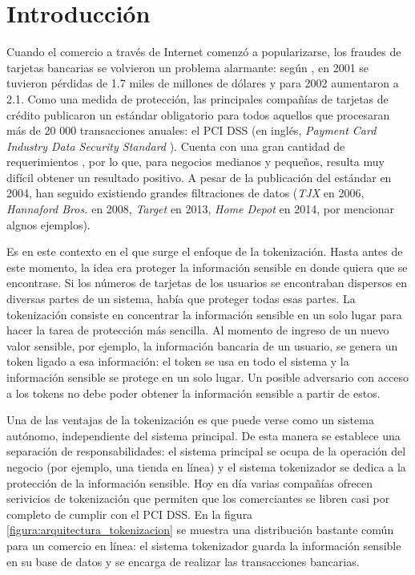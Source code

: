 %
%

\section{Introducción}


Cuando el comercio a través de Internet comenzó a popularizarse, los fraudes de
tarjetas bancarias se volvieron un problema alarmante: según \cite{wallethub},
en 2001 se tuvieron pérdidas de 1.7 miles de millones de dólares y para 2002
aumentaron a 2.1. Como una medida de protección, las principales compañías de
tarjetas de crédito publicaron un estándar obligatorio para todos aquellos que
procesaran más de 20 000 transacciones anuales: el PCI DSS (en inglés,
\textit{Payment Card Industry Data Security Standard} \cite{pci_dss}). Cuenta
con una gran cantidad de requerimientos \cite{uk_association}
\cite{search_security}, por lo que, para negocios medianos y pequeños, resulta
muy difícil obtener un resultado positivo. A pesar de la publicación del
estándar en 2004, han seguido existiendo grandes filtraciones de datos
(\textit{TJX} en 2006, \textit{Hannaford Bros.} en 2008, \textit{Target} en
2013, \textit{Home Depot} en 2014, por mencionar algnos ejemplos).


Es en este contexto en el que surge el enfoque de la tokenización. Hasta antes
de este momento, la idea era proteger la información sensible en donde quiera
que se encontrase. Si los números de tarjetas de los usuarios se encontraban
dispersos en diversas partes de un sistema, había que proteger todas esas partes.
La tokenización consiste en concentrar la información sensible en un solo lugar
para hacer la tarea de protección más sencilla. Al momento de ingreso de un
nuevo valor sensible, por ejemplo, la información bancaria de un usuario, se
genera un token ligado a esa información: el token se usa en todo el sistema y
la información sensible se protege en un solo lugar. Un posible adversario con
acceso a los tokens no debe poder obtener la información sensible a partir de
estos.

Una de las ventajas de la tokenización es que puede verse como un sistema
autónomo, independiente del sistema principal. De esta manera se establece una
separación de responsabilidades: el sistema principal se ocupa de la operación
del negocio (por ejemplo, una tienda en línea) y el sistema tokenizador se
dedica a la protección de la información sensible. Hoy en día varias compañías
ofrecen serivicios de tokenización que permiten que los comerciantes se libren
casi por completo de cumplir con el PCI DSS. En la figura
\ref{figura:arquitectura_tokenizacion} se muestra una distribución bastante
común para un comercio en línea: el sistema tokenizador guarda la información
sensible en su base de datos y se encarga de realizar las transacciones
bancarias.

